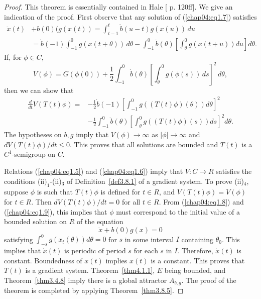 \documentclass{surv-l}
\theoremstyle{plain}
\theoremstyle{definition}
\numberwithin{equation}{section}
\numberwithin{figure}{chapter}
\begin{document}
\begin{proof}
This theorem is essentially contained in Hale [\citeyear{1977h} p. 120ff]. We give an indication of the proof. First observe that any solution of (\ref{chap04:eq1.7}) satisfies
\begin{equation}\label{chap04:eq1.8}
\begin{split}
\ddot{x}(t)&+b(0)(g(x(t))=\int_{t-1}^{t}\dot{b}(u-t)g(x(u))\,du\\
&=\dot{b}(-1)\int_{-1}^{0}g(x(t+\theta))\,d\theta-\int_{-1}^{0}\ddot{b}(\theta)\left[\int_{\theta}^{0}g(x(t+u))du\right]d\theta.
\end{split}
\end{equation}
If, for $\phi \in C$,
\begin{equation*}
 V(\phi)=G(\phi(0))+\frac{1}{2}\int_{-1}^{0}\dot{b}(\theta)\left[\int_{\theta}^{0}g(\phi(s))\,ds\right]^{2}\,d\theta,
\end{equation*}
then we can show that
\begin{equation}\label{chap04:eq1.9}
\begin{split}
\frac{d}{dt}V(T(t)\phi)=&-\frac{1}{2}\dot{b}(-1)\left[\int_{-1}^{0}g((T(t)\phi)(\theta))d\theta\right]^{2}\\ &-\frac{1}{2}\int_{-1}^{0}\ddot{b}(\theta)\left[\int_{\theta}^{0}g((T(t)\phi)(s))ds\right]^{2}d\theta.
\end{split}
\end{equation}
The hypotheses on $b,g$ imply that $ V(\phi)\rightarrow\infty$ as $|\phi|\rightarrow\infty$ and $dV(T(t)\phi)/dt\leq 0$. This proves that all solutions are bounded and $T(t)$ is a $C^{1}$-semigroup on $C$.

Relations (\ref{chap04:eq1.5}) and (\ref{chap04:eq1.6}) imply that $V\!:C\rightarrow R$ satisfies the conditions (ii$)_{1}$-(ii)$_{3}$ of Definition~\ref{def3.8.1} of a gradient system. To prove (ii)$_{4}$, suppose $\phi$ is such that $ T(t)\phi$ is defined for $t\in R$, and $V(T(t)\phi)=V(\phi)$ for $t\in R$. Then $dV(T(t)\phi)/dt= 0$ for all $t\in R$. From (\ref{chap04:eq1.8}) and (\ref{chap04:eq1.9}), this implies that $\phi$ must correspond to the initial value of a bounded solution on $R$ of the equation
\begin{equation*}
\ddot{x}+b(0)g(x)=0
\end{equation*}
satisfying $\int_{-s}^{0}g(x_{t}(\theta))d\theta=0$ for $s$ in some interval $I$ containing $\theta_{0}$. This implies that $\dot{x}(t)$ is periodic of period $s$ for each $s$ in $I$. Therefore, $\dot{x}(t)$ is constant. Boundedness of $x(t)$ implies $x(t)$ is a constant. This proves that $T(t)$ is a gradient system. Theorem~\ref{thm4.1.1}, $E$ being bounded, and Theorem~\ref{thm3.4.8} imply there is a global attractor $A_{b,g}$. The proof of the theorem is completed by applying Theorem~\ref{thm3.8.5}.


\end{proof}
\end{document}
